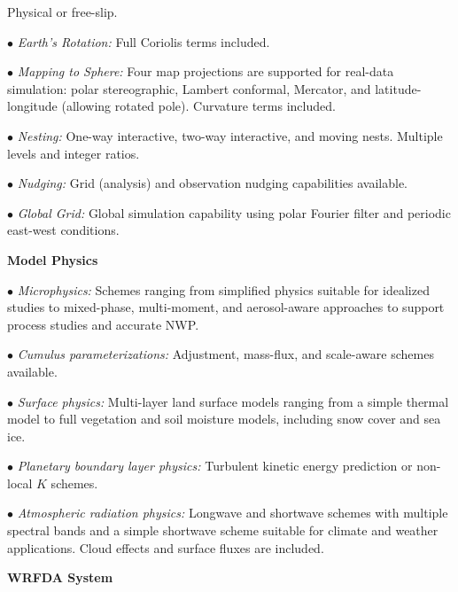 \begin{description}
Physical or free-slip.
%
\item{$\bullet$} {\em Earth's Rotation:}
Full Coriolis terms included.
%
\item{$\bullet$} {\em Mapping to Sphere:} 
Four map projections are supported for real-data simulation: 
polar stereographic, Lambert conformal, Mercator, and 
latitude-longitude (allowing rotated pole). 
Curvature terms included.
%
\item{$\bullet$} {\em Nesting:} 
One-way interactive, two-way interactive, and moving nests.
Multiple levels and integer ratios.
%
\item{$\bullet$} {\em Nudging:}
Grid (analysis) and observation nudging capabilities available. 
%
\item{$\bullet$} {\em Global Grid:}
Global simulation capability using polar Fourier filter and 
periodic east-west conditions. 
\end{description}

\newpage
\vskip 12pt
{\noindent\bf Model Physics}
\vskip 12pt

\begin{description}
\setlength{\itemsep}{-5pt}
\item{$\bullet$} {\em Microphysics:} Schemes ranging from simplified
physics suitable for idealized studies to mixed-phase, multi-moment, and aerosol-aware
approaches to support process studies and accurate NWP.
%
\item{$\bullet$} {\em Cumulus parameterizations:}
Adjustment, mass-flux, and scale-aware schemes available.
%
\item{$\bullet$} {\em Surface physics:}
Multi-layer land surface models ranging from a simple thermal model to full
vegetation and soil moisture models, including snow cover and sea ice.
%
\item{$\bullet$} {\em Planetary boundary layer physics:}
Turbulent kinetic energy prediction or non-local $K$ schemes.
%
\item{$\bullet$} {\em Atmospheric radiation physics:} 
Longwave and shortwave schemes with multiple spectral bands and a 
simple shortwave scheme suitable for climate and weather applications.  
Cloud effects and surface fluxes are included.
\end{description}

\vskip 12pt
{\noindent\bf WRFDA System}
\vskip 12pt

